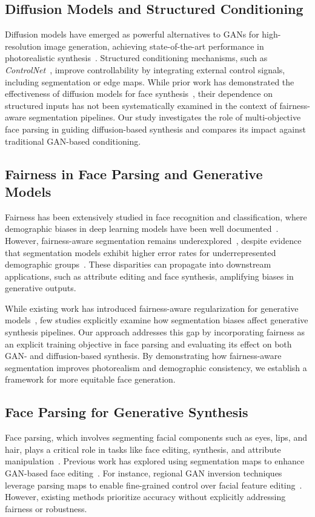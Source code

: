 \subsection{Diffusion Models and Structured Conditioning}
Diffusion models have emerged as powerful alternatives to GANs for high-resolution image generation, achieving state-of-the-art performance in photorealistic synthesis~\cite{ho2020denoising}. Structured conditioning mechanisms, such as \textit{ControlNet}~\cite{zhang2023adding}, improve controllability by integrating external control signals, including segmentation or edge maps. While prior work has demonstrated the effectiveness of diffusion models for face synthesis~\cite{rombach2022high}, their dependence on structured inputs has not been systematically examined in the context of fairness-aware segmentation pipelines. Our study investigates the role of multi-objective face parsing in guiding diffusion-based synthesis and compares its impact against traditional GAN-based conditioning.

\subsection{Fairness in Face Parsing and Generative Models}
Fairness has been extensively studied in face recognition and classification, where demographic biases in deep learning models have been well documented~\cite{buolamwini2018gender}. However, fairness-aware segmentation remains underexplored~\cite{grother2019face}, despite evidence that segmentation models exhibit higher error rates for underrepresented demographic groups~\cite{dhar2021pass}. These disparities can propagate into downstream applications, such as attribute editing and face synthesis, amplifying biases in generative outputs.

While existing work has introduced fairness-aware regularization for generative models~\cite{tan2020improving}, few studies explicitly examine how segmentation biases affect generative synthesis pipelines. Our approach addresses this gap by incorporating fairness as an explicit training objective in face parsing and evaluating its effect on both GAN- and diffusion-based synthesis. By demonstrating how fairness-aware segmentation improves photorealism and demographic consistency, we establish a framework for more equitable face generation.

\subsection{Face Parsing for Generative Synthesis}
Face parsing, which involves segmenting facial components such as eyes, lips, and hair, plays a critical role in tasks like face editing, synthesis, and attribute manipulation~\cite{luo2012hierarchical}. Previous work has explored using segmentation maps to enhance GAN-based face editing~\cite{park2019semantic}. For instance, regional GAN inversion techniques leverage parsing maps to enable fine-grained control over facial feature editing~\cite{xu2021facecontroller}. However, existing methods prioritize accuracy without explicitly addressing fairness or robustness.

